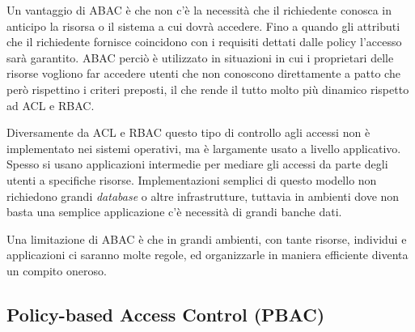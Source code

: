 Un vantaggio di \ac{ABAC} è che non c'è la necessità che il richiedente conosca in anticipo
la risorsa o il sistema a cui dovrà accedere. Fino a quando gli attributi che il richiedente fornisce 
coincidono con i requisiti dettati dalle policy l'accesso sarà garantito. \ac{ABAC} perciò è utilizzato in situazioni in 
cui i proprietari delle risorse vogliono far accedere utenti che non conoscono direttamente a patto che però rispettino i criteri preposti, il che rende il tutto molto più dinamico rispetto ad \ac{ACL} e \ac{RBAC}. \par
Diversamente da \ac{ACL} e \ac{RBAC} questo tipo di controllo agli 
accessi non è implementato nei sistemi operativi, ma è largamente usato a livello applicativo.
Spesso si usano applicazioni intermedie per mediare gli accessi da parte degli utenti a specifiche risorse.
Implementazioni semplici di questo modello non richiedono grandi \textit{database} o altre infrastrutture, tuttavia in ambienti dove non basta una semplice applicazione c'è necessità di grandi banche dati.\par
Una limitazione di \ac{ABAC} è che in grandi ambienti, con tante risorse, individui e applicazioni ci saranno molte regole, ed organizzarle in maniera efficiente diventa un compito oneroso.


\subsection*{Policy-based Access Control (PBAC)} %
\label{sub:policy_based_access_control_}

